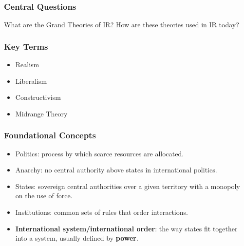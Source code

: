 \documentclass{beamer}
\begin{document}
\begin{frame} 
	\frametitle{\LARGE{Central Questions}}
	\begin{center}
		\LARGE What are the Grand Theories of IR? 
		\LARGE How are these theories used in IR today? 
	\end{center}
\end{frame}

\begin{frame} 
	\frametitle{\LARGE{Key Terms}}
	\begin{itemize}
		\item Realism
		\item Liberalism
		\item Constructivism
		\item Midrange Theory 
	\end{itemize}
\end{frame}

\begin{frame} 
\frametitle{\LARGE{Foundational Concepts}}
    \begin{itemize}
        \item Politics: process by which scarce resources are allocated.
        \item Anarchy: no central authority above states in international politics.
        \item States: sovereign central authorities over a given territory with a monopoly on the use of force.
        \item Institutions: common sets of rules that order interactions.
        \item \textbf{International system/international order}: the way states fit together into a system, usually defined by \textbf{power}.
    \end{itemize}
\end{frame}
\end{document}
